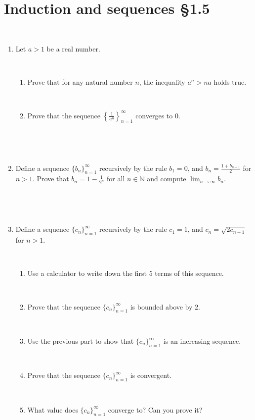 \documentclass[12pt]{amsart}
\newcommand{\N}{\mathbb{N}}
\begin{document}
	
	\thispagestyle{empty}
	
	\section*{Induction and sequences \S1.5}

	\

\begin{enumerate}


\item Let $a>1$ be a real number. 

\

\begin{enumerate}
\item Prove that for any natural number $n$, the inequality $a^n > na$ holds true.

\

\item Prove that the sequence  $\left\{ \frac{1}{a^n} \right\}_{n=1}^\infty$ converges to $0$.
\end{enumerate}

\

\

\item Define a sequence $\{ b_n\}_{n=1}^\infty$ recursively by the rule $b_1=0$, and $\displaystyle b_{n} = \frac{1+ b_{n-1}}{2}$ for $n>1$. Prove that $\displaystyle b_n = 1 - \frac{1}{2^n}$ for all $n\in \N$ and compute $\displaystyle\lim_{n\to \infty} b_n$.

\

\

\item Define a sequence $\{ c_n\}_{n=1}^\infty$ recursively by the rule $c_1=1$, and $\displaystyle c_{n} = \sqrt{2 c_{n-1}}$ for $n>1$. 

\

\begin{enumerate}
\item Use a calculator to write down the first $5$ terms of this sequence.

\


\item Prove that the sequence $\{c_n\}_{n=1}^\infty$ is bounded above by $2$.

\

\item Use the previous part to show that $\{c_n\}_{n=1}^\infty$ is an increasing sequence.

\

\item Prove that the sequence $\{c_n\}_{n=1}^\infty$ is convergent.

\

\item What value does $\{c_n\}_{n=1}^\infty$ converge to? Can you prove it?
\end{enumerate}







\end{enumerate}
\end{document}
